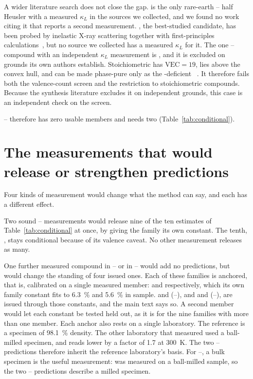 \documentclass[preprint, 12pt]{elsarticle}
\begin{document}
A wider literature search does not close the gap.  is the only rare-earth --
half Heusler with a measured $\kappa_L$ in the sources we collected, and we found no work citing it
that reports a second measurement. , the best-studied candidate, has been probed by
inelastic X-ray scattering together with first-principles calculations~\cite{li2024multiphono}, but
no source we collected has a measured $\kappa_L$ for it. The one -- compound with an
independent $\kappa_L$ measurement is , and it is excluded on grounds its own authors
establish. Stoichiometric  has $\mathrm{VEC}=19$, lies above the convex hull, and can be
made phase-pure only as the -deficient ~\cite{ren2023vacancymed,liu2025stabilizat}.
It therefore fails both the valence-count screen and the restriction to stoichiometric compounds.
Because the synthesis literature excludes it on independent grounds, this case is an independent check
on the screen.

-- therefore has zero usable members and needs two (Table~\ref{tab:conditional}).

\section{The measurements that would release or strengthen predictions}
\label{sec:fourteen}

Four kinds of measurement would change what the method can say, and each has a different effect.

Two sound -- measurements would release nine of the ten estimates of
Table~\ref{tab:conditional} at once, by giving the family its own constant. The tenth, ,
stays conditional because of its valence caveat. No other measurement releases as many.

One further measured compound in -- or in -- would add no predictions,
but would change the standing of four issued ones. Each of these families is anchored, that is,
calibrated on a single measured member:  and  respectively, which its own
family constant fits to \SI{6.3}{\percent} and \SI{5.6}{\percent} in sample.  and
 (--), and  and  (--), are issued
through those constants, and the main text says so. A second member would let each constant be
tested held out, as it is for the nine families with more than one member. Each anchor also rests
on a single laboratory. The  reference is a specimen of \SI{98.1}{\percent} density. The
other laboratory that measured  used a ball-milled specimen, and reads lower by a factor
of \num{1.7} at \SI{300}{\kelvin}. The two -- predictions therefore inherit the
reference laboratory's basis. For --, a bulk specimen is the useful measurement:
 was measured on a ball-milled sample, so the two -- predictions describe a
milled specimen.
\end{document}
